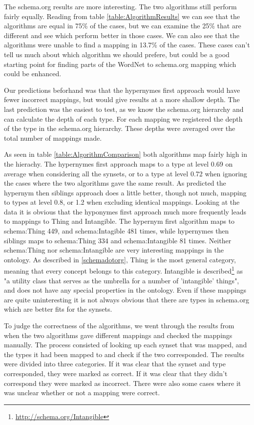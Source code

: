 The schema.org results are more interesting.
The two algorithms still perform fairly equally.
Reading from table \ref{table:AlgorithmResults} we can see that the algorithms are equal in 75\% of the cases,
but we can examine the 25\% that are different and see which perform better in those cases.
We can also see that the algorithms were unable to find a mapping in 13.7\% of the cases.
These cases can't tell us much about which algorithm we should prefere,
but could be a good starting point for finding parts of the WordNet to schema.org mapping which could be enhanced.

Our predictions beforhand was that the hypernymes first approach would have fewer incorrect mappings,
but would give results at a more shallow depth.
The last prediction was the easiest to test, as we know the schema.org hierarchy and can calculate the depth of each type.
For each mapping we registered the depth of the type in the schema.org hierarchy.
These depths were averaged over the total number of mappings made.

As seen in table \ref{table:AlgorithmComparison} both algorithms map fairly high in the hierachy.
The hypernymes first approach maps to a type at level 0.69 on average when considering all the synsets,
or to a type at level 0.72 when ignoring the cases where the two algorithms gave the same result.
As predicted the hypernym then siblings approach does a little better, though not much,
mapping to types at level 0.8, or 1.2 when excluding identical mappings.
Looking at the data it is obvious that the hyponymes first approach much more frequently leads to mappings to Thing and Intangible.
The hypernym first algorithm maps to schema:Thing 449, and schema:Intagible 481 times,
while hypernymes then siblings maps to schema:Thing 334 and schema:Intangible 81 times.
Neither schema:Thing nor schema:Intangible are very interesting mappings in the ontology.
As described in \ref{schemadotorg}, Thing is the most general category, meaning that every concept belongs to this category.
Intangible is described\footnote{\url{http://schema.org/Intangible}} as "a utility class that serves as the umbrella for a number of 'intangible' things",
and does not have any special properties in the ontology.
Even if these mappings are quite uninteresting it is not always obvious that there are types in schema.org which are better fits for the synsets.

To judge the correctness of the algorithms,
we went through the results from when the two algorithms gave different mappings and checked the mappings manually.
The process consisted of looking up each synset that was mapped,
and the types it had been mapped to and check if the two corresponded.
The results were divided into three categories.
If it was clear that the synset and type corresponded, they were marked as correct.
If it was clear that they didn't correspond they were marked as incorrect.
There were also some cases where it was unclear whether or not a mapping were correct.

